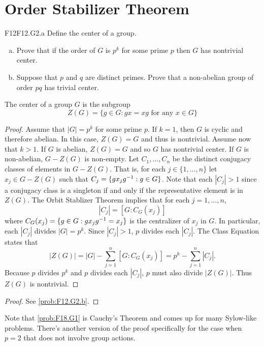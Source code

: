 \documentclass[../AlgebraQualSolutions.tex]{subfiles}
\begin{document}
\section{Order Stabilizer Theorem}


\begin{prob}{F12}{F12.G2.a}
Define the center of a group.
\begin{enumerate}[(a)]
\item Prove that if the order of $G$ is $p^k$ for some prime $p$ then $G$ has nontrivial center.
\item Suppose that $p$ and $q$ are distinct primes. Prove that a non-abelian group of order $pq$ has trivial center.
\end{enumerate}
\end{prob}

The center of a group $G$ is the subgroup
	\[Z(G) = \{g \in G: gx = xg \textrm{ for any $x \in G$} \} \]

\begin{proof}
Assume that $|G| = p^k$ for some prime $p$. If $k = 1$, then $G$ is cyclic and therefore abelian. In this case, $Z(G) = G$ and thus is nontrivial. Assume now that $k > 1$. If $G$ is abelian, $Z(G) = G$ and so $G$ has nontrivial center. If $G$ is non-abelian, $G - Z(G)$ is non-empty. Let $C_1, \ldots, C_n$ be the distinct conjugacy classes of elements in $G - Z(G)$. That is, for each $j \in \{1, \ldots, n\}$ let $x_j \in G - Z(G)$ such that $C_j = \{gx_jg^{-1}: g \in G\}$. Note that each $|C_j| > 1$ since a conjugacy class is a singleton if and only if the representative element is in $Z(G)$. The Orbit Stablizer Theorem implies that for each $j = 1, \ldots, n$,
	\[ |C_j| =  [G: C_G(x_j)] \]
where $C_G(x_j) = \{g \in G: gx_jg^{-1} = x_j \}$ is the centralizer of $x_j$ in $G$. In particular, each $|C_j|$ divides $|G| = p^k$. Since $|C_j| > 1$, $p$ divides each $|C_j|$. The Class Equation states that 
	\[|Z(G)| = |G| - \sum_{j=1}^n [G: C_G(x_j)] = p^k -  \sum_{j=1}^n |C_j| .\]
Because $p$ divides $p^k$ and $p$ divides each $|C_j|$, $p$ must also divide $|Z(G)|$. Thus $Z(G)$ is nontrivial.
\end{proof}

\begin{proof}
	See \ref{prob:F12.G2.b}.
\end{proof}

Note that \ref{prob:F18.G1} is Cauchy's Theorem and comes up for many Sylow-like problems. There's another version of the proof specifically for the case when $p = 2$ that does not involve group actions.
\end{document}
